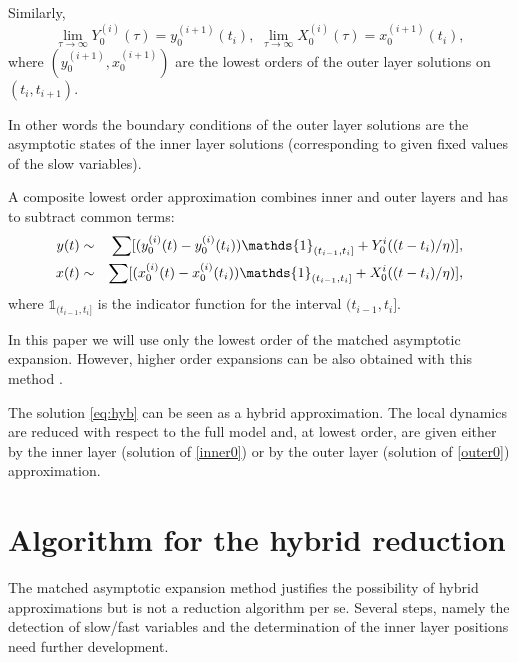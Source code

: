 \documentclass{llncs}
\begin{document}
 Similarly,
  \begin{equation}
 \lim_{\tau \to \infty} Y_0^{(i)}( \tau ) =  y_0^{(i+1)}(t_i), \,\, \lim_{\tau \to \infty} X_0^{(i)}( \tau ) =  x_0^{(i+1)}(t_i), \label{matching2}
 \end{equation}
where  $(y_0^{(i+1)},x_0^{(i+1)})$ are the lowest orders of the outer layer solutions on $(t_{i},t_{i+1})$.

In other words the boundary conditions of the outer layer solutions are the asymptotic states of the inner layer solutions (corresponding to given fixed values of the slow variables).

A composite lowest order approximation combines inner and outer layers and has to subtract common terms:
\begin{eqnarray}\label{eq:hyb}
y(t) &\sim &\sum [ (y^{(i)}_0(t) - y_0^{(i)}(t_i)) \mathds{1}_{(t_{i-1},t_i]} + Y_0^{i}((t-t_i)/\eta)  ],\notag \\
x(t) &\sim &\sum [ (x^{(i)}_0(t) - x_0^{(i)}(t_i)) \mathds{1}_{(t_{i-1},t_i]} + X_0^{i}((t-t_i)/\eta)  ],
\end{eqnarray}
where $\mathds{1}_{(t_{i-1},t_i]}$ is the indicator function for the interval $(t_{i-1},t_i]$.

 {In this paper we will use only the lowest order of the matched asymptotic expansion. However, higher order
expansions can be also obtained with this method \cite{lagerstrom1972basic,holmes2012introduction}.}

 {The solution \eqref{eq:hyb}} can be seen as a hybrid approximation. The
local dynamics are reduced  {with respect to the full model and, at lowest
order,} are given either by the inner layer (solution of \eqref{inner0}) or by
the outer layer (solution of \eqref{outer0}) approximation.

\section{Algorithm for the hybrid reduction}\label{section:Algorithm}
The matched asymptotic expansion method justifies the possibility of hybrid
approximations but is not a reduction algorithm per se. Several steps, namely
the detection of slow/fast variables and the determination of the inner layer
positions need further development.
\end{document}
